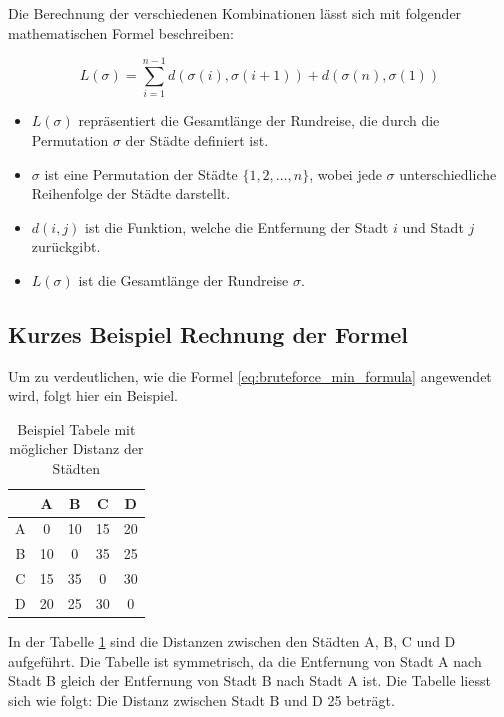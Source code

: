 Die Berechnung der verschiedenen Kombinationen lässt sich mit folgender 
mathematischen Formel beschreiben:

\begin{equation}
    \label{eq:bruteforce_min_formula}
    L(\sigma) = \sum_{i=1}^{n-1} d(\sigma(i), \sigma(i+1)) + d(\sigma(n), \sigma(1))
\end{equation}

\begin{itemize}
    \item \( L(\sigma) \) repräsentiert die Gesamtlänge der Rundreise, die durch
          die Permutation \( \sigma \) der Städte definiert ist.
    \item \( \sigma \) ist eine Permutation der Städte \( \{1, 2, \ldots, n\} \),
          wobei jede \( \sigma \) unterschiedliche Reihenfolge der Städte darstellt.
    \item \( d(i, j) \) ist die Funktion, welche die Entfernung der Stadt \( i \) und
          Stadt \( j \) zurückgibt.
    \item \( L(\sigma) \) ist die Gesamtlänge der Rundreise \( \sigma \).
\end{itemize}

\subsection{Kurzes Beispiel Rechnung der Formel
\label{buch:paper:varalg:subsection:bruteforce_calculate}}
Um zu verdeutlichen, wie die Formel \ref{eq:bruteforce_min_formula}
angewendet wird, folgt hier ein Beispiel.

\begin{table}[h]
    \centering
    \begin{tabular}{|c|c|c|c|c|}
        \hline
          & A  & B  & C  & D  \\ \hline
        A & 0  & 10 & 15 & 20 \\ \hline
        B & 10 & 0  & 35 & 25 \\ \hline
        C & 15 & 35 & 0  & 30 \\ \hline
        D & 20 & 25 & 30 & 0  \\ \hline
    \end{tabular}
    \caption{Beispiel Tabele mit möglicher Distanz der Städten}
    \label{tab:example_bruteforce_cities}
\end{table}

In der Tabelle \ref{tab:example_bruteforce_cities} sind die Distanzen 
zwischen den Städten A, B, C und D aufgeführt. Die Tabelle ist symmetrisch, 
da die Entfernung von Stadt A nach Stadt B gleich der Entfernung von 
Stadt B nach Stadt A ist.
Die Tabelle liesst sich wie folgt: Die Distanz zwischen Stadt B und D 25 beträgt.

